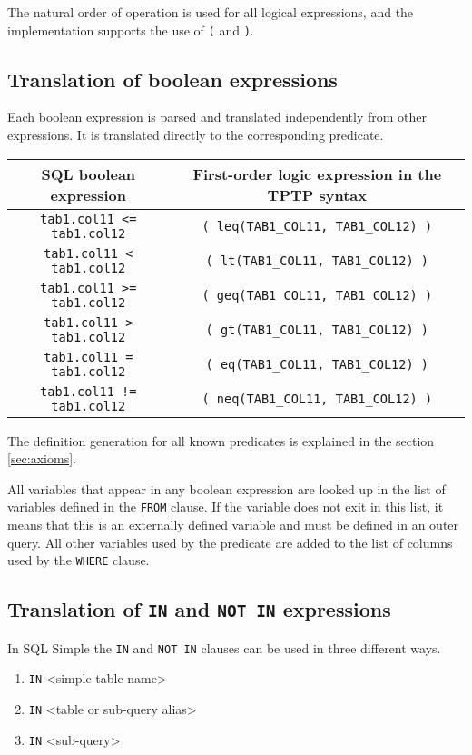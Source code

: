\documentclass[magisterska,en]{pracamgr}
\newcommand{\code}[1]{\texttt{#1}}
\begin{document}
The natural order of operation is used for all logical expressions, and the implementation supports the use of \code{(} and \code{)}.

\subsection{Translation of boolean expressions}

Each boolean expression is parsed and translated independently from other expressions. It is translated directly to the corresponding predicate.
\renewcommand{\arraystretch}{1.5}
\begin{center}
 \begin{tabular}{ c | c }
 SQL boolean expression & First-order logic expression in the TPTP syntax \\
 \hline
 \code{tab1.col11 <= tab1.col12} & \code{( leq(TAB1_COL11, TAB1_COL12) )} \\
 \code{tab1.col11 < tab1.col12} & \code{( lt(TAB1_COL11, TAB1_COL12) )} \\  
 \code{tab1.col11 >= tab1.col12} & \code{( geq(TAB1_COL11, TAB1_COL12) )} \\ 
 \code{tab1.col11 > tab1.col12} & \code{( gt(TAB1_COL11, TAB1_COL12) )} \\ 
 \code{tab1.col11 = tab1.col12} & \code{( eq(TAB1_COL11, TAB1_COL12) )} \\
 \code{tab1.col11 != tab1.col12} & \code{( neq(TAB1_COL11, TAB1_COL12) )}
\end{tabular}
\end{center}

The definition generation for all known predicates is explained in the section \ref{sec:axioms}.

All variables that appear in any boolean expression are looked up in the list of variables defined in the \code{FROM} clause. If the variable does not exit in this list, it means that this is an externally defined variable and must be defined in an outer query. All other variables used by the predicate are added to the list of columns used by the \code{WHERE} clause.

\subsection{Translation of \code{IN} and \code{NOT IN} expressions}

In SQL Simple the \code{IN} and \code{NOT IN} clauses can be used in three different ways.
\begin{enumerate}
    \item <column name or alias> [\code{NOT}] \code{IN} <simple table name>
    \item <column name or alias> [\code{NOT}] \code{IN} <table or sub-query alias>
    \item <column name or alias> [\code{NOT}] \code{IN} <sub-query>
\end{enumerate}
\end{document}
